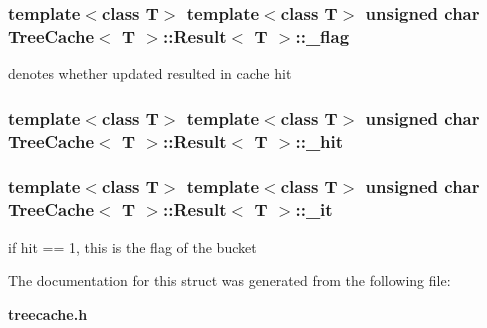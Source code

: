 \subsubsection{\setlength{\rightskip}{0pt plus 5cm}template$<$class T$>$ template$<$class T$>$ unsigned char {\bf Tree\-Cache}$<$ T $>$::{\bf Result}$<$ T $>$::{\bf \_\-flag}}\label{structTreeCache_1_1Result_o1}


denotes whether updated resulted in cache hit 

\subsubsection{\setlength{\rightskip}{0pt plus 5cm}template$<$class T$>$ template$<$class T$>$ unsigned char {\bf Tree\-Cache}$<$ T $>$::{\bf Result}$<$ T $>$::{\bf \_\-hit}}\label{structTreeCache_1_1Result_o0}


\subsubsection{\setlength{\rightskip}{0pt plus 5cm}template$<$class T$>$ template$<$class T$>$ unsigned char {\bf Tree\-Cache}$<$ T $>$::{\bf Result}$<$ T $>$::{\bf \_\-it}}\label{structTreeCache_1_1Result_o2}


if hit == 1, this is the flag of the bucket 



The documentation for this struct was generated from the following file:\begin{CompactItemize}
\item 
{\bf treecache.h}\end{CompactItemize}
